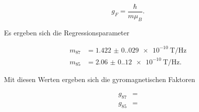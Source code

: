 \begin{equation}
  g_{F} = \frac{\hbar}{m \mu_{B}}.
  \label{eqn:gyrom}
\end{equation}

Es ergeben sich die Regressionsparameter

\begin{align}
  m_{87}  & =  \SI{1.422(0.029)e-10}{\tesla\per\hertz}\\
  m_{85}  & =  \SI{2.06(0.12)e-10}{\tesla\per\hertz}.
\end{align}

Mit diesen Werten ergeben sich die gyromagnetischen Faktoren

\begin{align}
	g_{87} & = \\
  g_{85} & =
\end{align}
